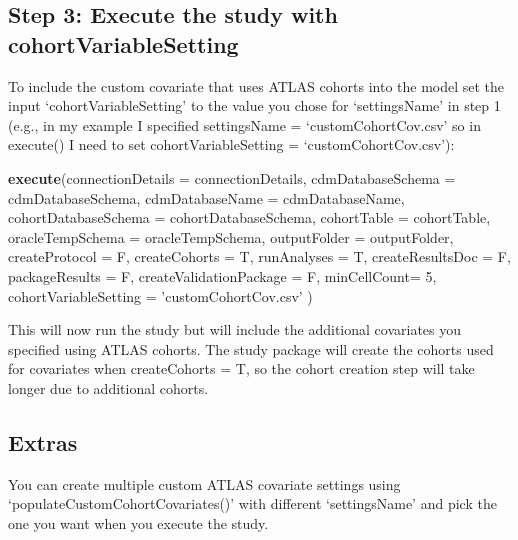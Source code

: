 \documentclass[
]{article}
\newenvironment{Shaded}{\begin{snugshade}}{\end{snugshade}}
\newcommand{\DataTypeTok}[1]{\textcolor[rgb]{0.13,0.29,0.53}{#1}}
\newcommand{\DecValTok}[1]{\textcolor[rgb]{0.00,0.00,0.81}{#1}}
\newcommand{\KeywordTok}[1]{\textcolor[rgb]{0.13,0.29,0.53}{\textbf{#1}}}
\newcommand{\NormalTok}[1]{#1}
\newcommand{\StringTok}[1]{\textcolor[rgb]{0.31,0.60,0.02}{#1}}
\begin{document}
\hypertarget{step-3-execute-the-study-with-cohortvariablesetting}{%
\subsection{Step 3: Execute the study with
cohortVariableSetting}\label{step-3-execute-the-study-with-cohortvariablesetting}}

To include the custom covariate that uses ATLAS cohorts into the model
set the input `cohortVariableSetting' to the value you chose for
`settingsName' in step 1 (e.g., in my example I specified settingsName =
`customCohortCov.csv' so in execute() I need to set
cohortVariableSetting = `customCohortCov.csv'):

\begin{Shaded}
\begin{Highlighting}[]
\KeywordTok{execute}\NormalTok{(}\DataTypeTok{connectionDetails =}\NormalTok{ connectionDetails,}
        \DataTypeTok{cdmDatabaseSchema =}\NormalTok{ cdmDatabaseSchema,}
            \DataTypeTok{cdmDatabaseName =}\NormalTok{ cdmDatabaseName,}
        \DataTypeTok{cohortDatabaseSchema =}\NormalTok{ cohortDatabaseSchema,}
        \DataTypeTok{cohortTable =}\NormalTok{ cohortTable,}
        \DataTypeTok{oracleTempSchema =}\NormalTok{ oracleTempSchema,}
        \DataTypeTok{outputFolder =}\NormalTok{ outputFolder,}
        \DataTypeTok{createProtocol =}\NormalTok{ F,}
        \DataTypeTok{createCohorts =}\NormalTok{ T,}
        \DataTypeTok{runAnalyses =}\NormalTok{ T,}
        \DataTypeTok{createResultsDoc =}\NormalTok{ F,}
        \DataTypeTok{packageResults =}\NormalTok{ F,}
        \DataTypeTok{createValidationPackage =}\NormalTok{ F,}
        \DataTypeTok{minCellCount=} \DecValTok{5}\NormalTok{,}
        \DataTypeTok{cohortVariableSetting =} \StringTok{'customCohortCov.csv'}
\NormalTok{)}
\end{Highlighting}
\end{Shaded}

This will now run the study but will include the additional covariates
you specified using ATLAS cohorts. The study package will create the
cohorts used for covariates when createCohorts = T, so the cohort
creation step will take longer due to additional cohorts.

\hypertarget{extras}{%
\subsection{Extras}\label{extras}}

You can create multiple custom ATLAS covariate settings using
`populateCustomCohortCovariates()' with different `settingsName' and
pick the one you want when you execute the study.
\end{document}
